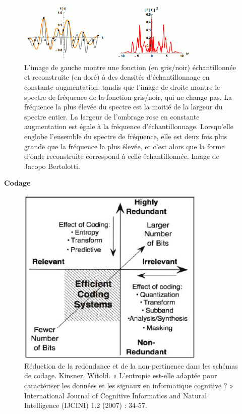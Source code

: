 \begin{figure}[H] %
    \centering
    \includegraphics[width=0.8\textwidth]{figures/Nyquist_sampling.png}
    \caption{L'image de gauche montre une fonction (en gris/noir) échantillonnée et reconstruite (en doré) à des densités d'échantillonnage en constante augmentation, tandis que l'image de droite montre le spectre de fréquence de la fonction gris/noir, qui ne change pas. La fréquence la plus élevée du spectre est la moitié de la largeur du spectre entier. La largeur de l'ombrage rose en constante augmentation est égale à la fréquence d'échantillonnage. Lorsqu'elle englobe l'ensemble du spectre de fréquence, elle est deux fois plus grande que la fréquence la plus élevée, et c'est alors que la forme d'onde reconstruite correspond à celle échantillonnée. Image de Jacopo Bertolotti.}
    \label{fig:communication2}
\end{figure}
\textbf{Codage}
\begin{figure}[H] %
    \centering
    \includegraphics[width=0.8\textwidth]{figures/6-20.jpg}
    \caption{Réduction de la redondance et de la non-pertinence dans les schémas de codage. Kinsner, Witold. « L'entropie est-elle adaptée pour caractériser les données et les signaux en informatique cognitive ? » International Journal of Cognitive Informatics and Natural Intelligence (IJCINI) 1.2 (2007) : 34-57.}
    \label{fig:communication2}
\end{figure}
